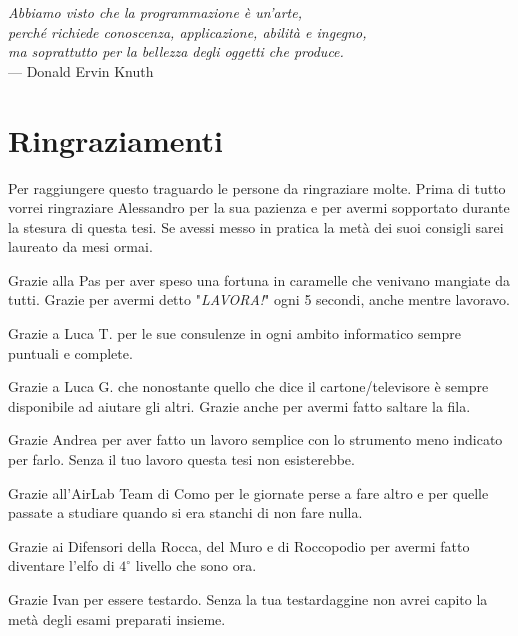 \cleardoublepage
{}
{}

\begin{flushright}{\slshape    
	Abbiamo visto che la programmazione è un'arte, \\
	perché richiede conoscenza, applicazione, abilità e ingegno, \\
	ma soprattutto per la bellezza degli oggetti che produce.} \\ \medskip
    --- Donald Ervin Knuth
\end{flushright}


\bigskip

\begingroup
\let\clearpage\relax
\let\cleardoublepage\relax
\let\cleardoublepage\relax

\chapter*{Ringraziamenti}
Per raggiungere questo traguardo le persone da ringraziare molte. Prima di tutto
vorrei ringraziare Alessandro per la sua pazienza e per avermi sopportato durante
la stesura di questa tesi. Se avessi messo in pratica la metà dei suoi consigli
sarei laureato da mesi ormai.

Grazie alla Pas per aver speso una fortuna in caramelle che venivano mangiate da
tutti. Grazie per avermi detto "\emph{LAVORA!}" ogni 5 secondi, anche mentre
lavoravo.

Grazie a Luca T. per le sue consulenze in ogni ambito informatico sempre puntuali
e complete.

Grazie a Luca G. che nonostante quello che dice il cartone/televisore è sempre
disponibile ad aiutare gli altri. Grazie anche per avermi fatto saltare la fila.

Grazie Andrea per aver fatto un lavoro semplice con lo strumento meno indicato
per farlo. Senza il tuo lavoro questa tesi non esisterebbe.

Grazie all'AirLab Team di Como per le giornate perse a fare altro e per quelle
passate a studiare quando si era stanchi di non fare nulla.

Grazie ai Difensori della Rocca, del Muro e di Roccopodio per avermi fatto
diventare l'elfo di $4^{\circ}$ livello che sono ora.

Grazie Ivan per essere testardo. Senza la tua testardaggine non avrei capito la
metà degli esami preparati insieme.

